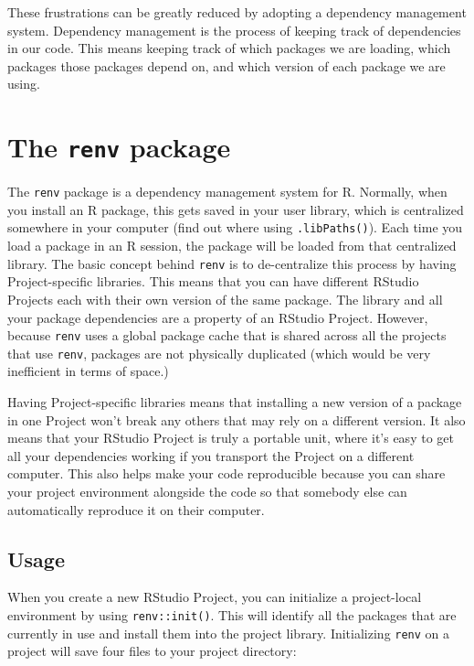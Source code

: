 \documentclass[
]{book}
\begin{document}
These frustrations can be greatly reduced by adopting a dependency management
system. Dependency management is the process of keeping track of dependencies
in our code. This means keeping track of which packages we are loading, which
packages those packages depend on, and which version of each package we are
using.

\hypertarget{the-renv-package}{%
\section{\texorpdfstring{The \texttt{renv} package}{The renv package}}\label{the-renv-package}}

The \texttt{renv} package is a dependency management system for R. Normally, when you
install an R package, this gets saved in your user library, which is centralized
somewhere in your computer (find out where using \texttt{.libPaths()}). Each time you
load a package in an R session, the package will be loaded from that centralized
library. The basic concept behind \texttt{renv} is to de-centralize this process by
having Project-specific libraries. This means that you can have different
RStudio Projects each with their own version of the same package. The library
and all your package dependencies are a property of an RStudio Project. However,
because \texttt{renv} uses a global package cache that is shared across all the
projects that use \texttt{renv}, packages are not physically duplicated (which would be
very inefficient in terms of space.)

Having Project-specific libraries means that installing a new version of a
package in one Project won't break any others that may rely on a different
version. It also means that your RStudio Project is truly a portable unit, where
it's easy to get all your dependencies working if you transport the Project on
a different computer. This also helps make your code reproducible because
you can share your project environment alongside the code so that somebody else
can automatically reproduce it on their computer.

\hypertarget{usage}{%
\subsection{Usage}\label{usage}}

When you create a new RStudio Project, you can initialize a project-local
environment by using \texttt{renv::init()}. This will identify all the packages that
are currently in use and install them into the project library. Initializing
\texttt{renv} on a project will save four files to your project directory:
\end{document}
